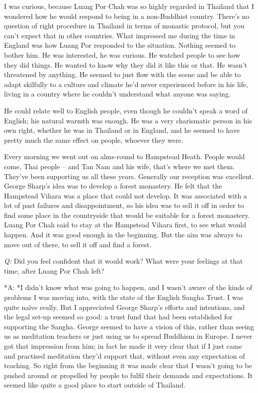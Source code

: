 I was curious, because Luang Por Chah was so highly regarded in Thailand
that I wondered how he would respond to being in a non-Buddhist country. 
There's no question of right procedure in Thailand in terms of monastic
protocol, but you can't expect that in other countries. What impressed
me during the time in England was how Luang Por responded to the
situation. Nothing seemed to bother him. He was interested, he was
curious. He watched people to see how they did things. He wanted to know
why they did it like this or that. He wasn't threatened by anything. He
seemed to just flow with the scene and be able to adapt skilfully to a
culture and climate he'd never experienced before in his life, living in
a country where he couldn't understand what anyone was saying. 

He could relate well to English people, even though he couldn't speak a
word of English; his natural warmth was enough. He was a very
charismatic person in his own right, whether he was in Thailand or in
England, and he seemed to have pretty much the same effect on people, 
whoever they were. 

Every morning we went out on alms-round to Hampstead Heath. People would
come, Thai people -- and Tan Nam and his wife, that's where we met them. 
They've been supporting us all these years. Generally our reception was
excellent. George Sharp's idea was to develop a forest monastery. He
felt that the Hampstead Vihara was a place that could not develop. It
was associated with a lot of past failures and disappointment, so his
idea was to sell it off in order to find some place in the countryside
that would be suitable for a forest monastery. Luang Por Chah said to
stay at the Hampstead Vihara first, to see what would happen. And it was
good enough in the beginning. But the aim was always to move out of
there, to sell it off and find a forest. 

\emph{Q:} Did you feel confident that it would work? What were your
feelings at that time, after Luang Por Chah left? 

*A: *I didn't know what was going to happen, and I wasn't aware of the
kinds of problems I was moving into, with the state of the English
Sangha Trust. I was quite naïve really. But I appreciated George Sharp's
efforts and intentions, and the legal set-up seemed so good: a trust
fund that had been established for supporting the Sangha. George seemed
to have a vision of this, rather than seeing us as meditation teachers
or just using us to spread Buddhism in Europe. I never got that
impression from him; in fact he made it very clear that if I just came
and practised meditation they'd support that, without even any
expectation of teaching. So right from the beginning it was made clear
that I wasn't going to be pushed around or propelled by people to fulfil
their demands and expectations. It seemed like quite a good place to
start outside of Thailand. 

